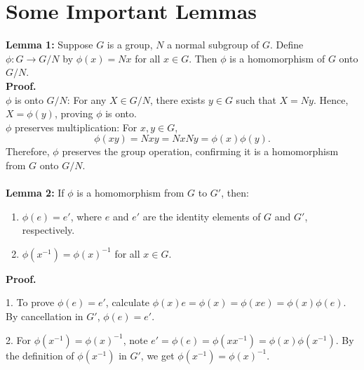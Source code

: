 \section{Some Important Lemmas}
\textbf{Lemma 1:} Suppose \( G \) is a group, \( N \) a normal subgroup of \( G \). Define \( \phi: G \to G/N \) by \( \phi(x) = Nx \) for all \( x \in G \). Then \( \phi \) is a homomorphism of \( G \) onto \( G/N \).
\\
\textbf{Proof.} \\
\( \phi \) is onto \( G/N \): For any \( X \in G/N \), there exists \( y \in G \) such that \( X = Ny \). Hence, \( X = \phi(y) \), proving \( \phi \) is onto.
\\
\( \phi \) preserves multiplication: For \( x, y \in G \),
   \[ \phi(xy) = Nxy = NxNy = \phi(x)\phi(y). \]
Therefore, \( \phi \) preserves the group operation, confirming it is a homomorphism from \( G \) onto \( G/N \).
\\\\
\textbf{Lemma 2:} If \( \phi \) is a homomorphism from \( G \) to \( G' \), then:
\begin{enumerate}
    \item \( \phi(e) = e' \), where \( e \) and \( e' \) are the identity elements of \( G \) and \( G' \), respectively.
    \item \( \phi(x^{-1}) = \phi(x)^{-1} \) for all \( x \in G \).
\end{enumerate}
\textbf{Proof.}

1. To prove \( \phi(e) = e' \), calculate \( \phi(x)e = \phi(x) = \phi(xe) = \phi(x)\phi(e) \). By cancellation in \( G' \), \( \phi(e) = e' \).

2. For \( \phi(x^{-1}) = \phi(x)^{-1} \), note \( e' = \phi(e) = \phi(xx^{-1}) = \phi(x)\phi(x^{-1}) \). By the definition of \( \phi(x^{-1}) \) in \( G' \), we get \( \phi(x^{-1}) = \phi(x)^{-1} \).


